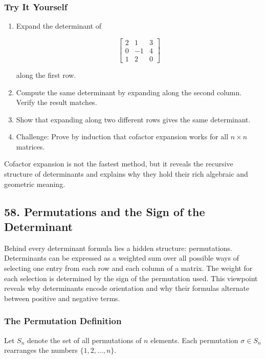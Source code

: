\documentclass[
  letterpaper,
  DIV=11,
  numbers=noendperiod]{scrreprt}
\begin{document}
\subsubsection{Try It Yourself}\label{try-it-yourself-56}

\begin{enumerate}
\def\labelenumi{\arabic{enumi}.}
\item
  Expand the determinant of

  \[
  \begin{bmatrix} 
  2 & 1 & 3 \\ 
  0 & -1 & 4 \\ 
  1 & 2 & 0 
  \end{bmatrix}
  \]

  along the first row.
\item
  Compute the same determinant by expanding along the second column.
  Verify the result matches.
\item
  Show that expanding along two different rows gives the same
  determinant.
\item
  Challenge: Prove by induction that cofactor expansion works for all
  \(n \times n\) matrices.
\end{enumerate}

Cofactor expansion is not the fastest method, but it reveals the
recursive structure of determinants and explains why they hold their
rich algebraic and geometric meaning.

\subsection{58. Permutations and the Sign of the
Determinant}\label{permutations-and-the-sign-of-the-determinant}

Behind every determinant formula lies a hidden structure: permutations.
Determinants can be expressed as a weighted sum over all possible ways
of selecting one entry from each row and each column of a matrix. The
weight for each selection is determined by the sign of the permutation
used. This viewpoint reveals why determinants encode orientation and why
their formulas alternate between positive and negative terms.

\subsubsection{The Permutation
Definition}\label{the-permutation-definition}

Let \(S_n\) denote the set of all permutations of \(n\) elements. Each
permutation \(\sigma \in S_n\) rearranges the numbers
\(\{1, 2, \ldots, n\}\).
\end{document}
